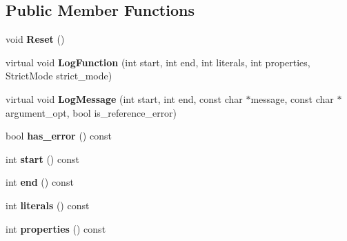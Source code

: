 \subsection*{Public Member Functions}
\begin{DoxyCompactItemize}
\item 
\hypertarget{classv8_1_1internal_1_1_singleton_logger_afcf71cbf0471db7bc5eaa93613428df8}{}void {\bfseries Reset} ()\label{classv8_1_1internal_1_1_singleton_logger_afcf71cbf0471db7bc5eaa93613428df8}

\item 
\hypertarget{classv8_1_1internal_1_1_singleton_logger_ad03a8f836d9d85e54f70df37f8b837db}{}virtual void {\bfseries Log\+Function} (int start, int end, int literals, int properties, Strict\+Mode strict\+\_\+mode)\label{classv8_1_1internal_1_1_singleton_logger_ad03a8f836d9d85e54f70df37f8b837db}

\item 
\hypertarget{classv8_1_1internal_1_1_singleton_logger_ab1a8811a428d05486bb14af230e71212}{}virtual void {\bfseries Log\+Message} (int start, int end, const char $\ast$message, const char $\ast$argument\+\_\+opt, bool is\+\_\+reference\+\_\+error)\label{classv8_1_1internal_1_1_singleton_logger_ab1a8811a428d05486bb14af230e71212}

\item 
\hypertarget{classv8_1_1internal_1_1_singleton_logger_a5dd3460d65eb773c7b0279c037846e9c}{}bool {\bfseries has\+\_\+error} () const \label{classv8_1_1internal_1_1_singleton_logger_a5dd3460d65eb773c7b0279c037846e9c}

\item 
\hypertarget{classv8_1_1internal_1_1_singleton_logger_ab59ea14aefe4a6c07b4243d281bc83b9}{}int {\bfseries start} () const \label{classv8_1_1internal_1_1_singleton_logger_ab59ea14aefe4a6c07b4243d281bc83b9}

\item 
\hypertarget{classv8_1_1internal_1_1_singleton_logger_a249cf182d6f57396ddc4be81eb678b27}{}int {\bfseries end} () const \label{classv8_1_1internal_1_1_singleton_logger_a249cf182d6f57396ddc4be81eb678b27}

\item 
\hypertarget{classv8_1_1internal_1_1_singleton_logger_a6c0671ed2f7be19d9c9f393a1d31316e}{}int {\bfseries literals} () const \label{classv8_1_1internal_1_1_singleton_logger_a6c0671ed2f7be19d9c9f393a1d31316e}

\item 
\hypertarget{classv8_1_1internal_1_1_singleton_logger_a62374c1757700f23c2c8320965a998c8}{}int {\bfseries properties} () const \label{classv8_1_1internal_1_1_singleton_logger_a62374c1757700f23c2c8320965a998c8}


\end{DoxyCompactItemize}
